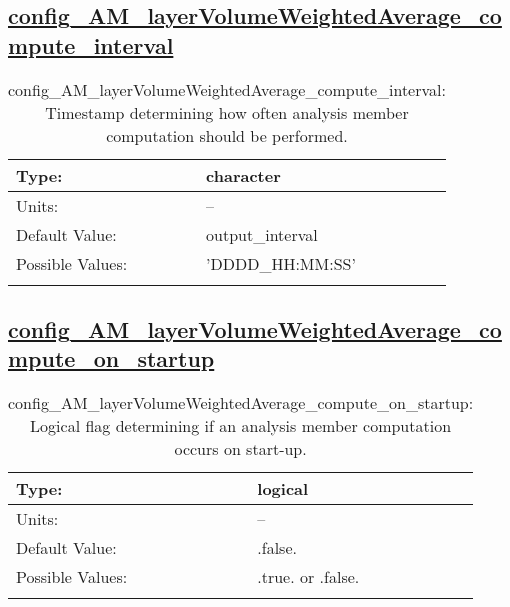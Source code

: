\subsection[config\_AM\_layerVolumeWeightedAverage\_compute\_interval]{\hyperref[sec:nm_tab_AM_layerVolumeWeightedAverage]{config\_AM\_layerVolumeWeightedAverage\_compute\_interval}}
\label{subsec:nm_sec_config_AM_layerVolumeWeightedAverage_compute_interval}
\begin{center}
\begin{longtable}{| p{2.0in} || p{4.0in} |}
    \hline
    Type: & character \\
    \hline
    Units: & -- \\
    \hline
    Default Value: & output\_interval \\
    \hline
    Possible Values: & 'DDDD\_HH:MM:SS' \\
    \hline
    \caption{config\_AM\_layerVolumeWeightedAverage\_compute\_interval: Timestamp determining how often analysis member computation should be performed.}
\end{longtable}
\end{center}
\subsection[config\_AM\_layerVolumeWeightedAverage\_compute\_on\_startup]{\hyperref[sec:nm_tab_AM_layerVolumeWeightedAverage]{config\_AM\_layerVolumeWeightedAverage\_compute\_on\_startup}}
\label{subsec:nm_sec_config_AM_layerVolumeWeightedAverage_compute_on_startup}
\begin{center}
\begin{longtable}{| p{2.0in} || p{4.0in} |}
    \hline
    Type: & logical \\
    \hline
    Units: & -- \\
    \hline
    Default Value: & .false. \\
    \hline
    Possible Values: & .true. or .false. \\
    \hline
    \caption{config\_AM\_layerVolumeWeightedAverage\_compute\_on\_startup: Logical flag determining if an analysis member computation occurs on start-up.}
\end{longtable}
\end{center}
